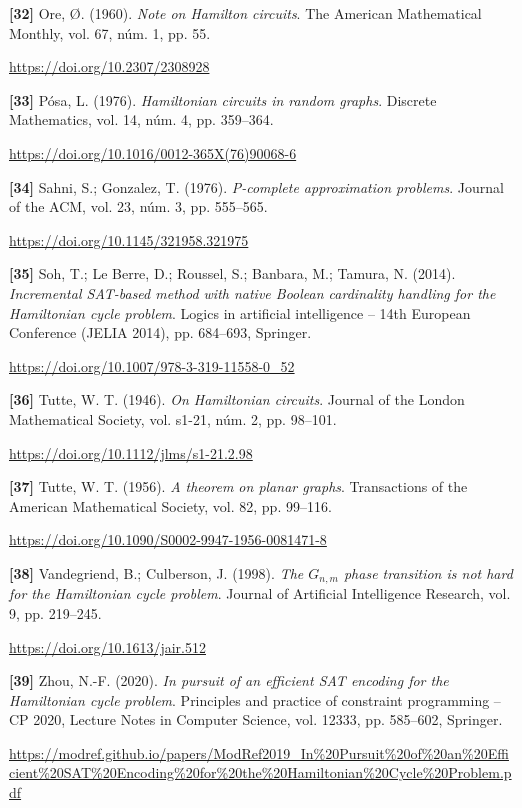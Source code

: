 \documentclass[11pt,a4paper]{article}
\newcommand{\referencia}[1]{\par\addvspace{0.8\baselineskip}\noindent\hangindent=1.1cm\hangafter=1 #1\par\nopagebreak}
\begin{document}
\begin{samepage}
\referencia{\textbf{[32]} Ore, {\O}. (1960). \textit{Note on {Hamilton} circuits}. The American Mathematical Monthly, vol. 67, núm. 1, pp. 55.}
 {\small\url{https://doi.org/10.2307/2308928}}\par
\end{samepage}
\begin{samepage}
\referencia{\textbf{[33]} P{\'o}sa, L. (1976). \textit{Hamiltonian circuits in random graphs}. Discrete Mathematics, vol. 14, núm. 4, pp. 359--364.}
 {\small\url{https://doi.org/10.1016/0012-365X(76)90068-6}}\par
\end{samepage}
\begin{samepage}
\referencia{\textbf{[34]} Sahni, S.; Gonzalez, T. (1976). \textit{P-complete approximation problems}. Journal of the ACM, vol. 23, núm. 3, pp. 555--565.}
 {\small\url{https://doi.org/10.1145/321958.321975}}\par
\end{samepage}
\begin{samepage}
\referencia{\textbf{[35]} Soh, T.; {Le Berre}, D.; Roussel, S.; Banbara, M.; Tamura, N. (2014). \textit{Incremental {SAT}-based method with native {Boolean} cardinality handling for the {Hamiltonian} cycle problem}. Logics in artificial intelligence -- 14th European Conference ({JELIA} 2014), pp. 684--693, Springer.}
 {\small\url{https://doi.org/10.1007/978-3-319-11558-0_52}}\par
\end{samepage}
\begin{samepage}
\referencia{\textbf{[36]} Tutte, W. T. (1946). \textit{On {Hamiltonian} circuits}. Journal of the London Mathematical Society, vol. s1-21, núm. 2, pp. 98--101.}
 {\small\url{https://doi.org/10.1112/jlms/s1-21.2.98}}\par
\end{samepage}
\begin{samepage}
\referencia{\textbf{[37]} Tutte, W. T. (1956). \textit{A theorem on planar graphs}. Transactions of the American Mathematical Society, vol. 82, pp. 99--116.}
 {\small\url{https://doi.org/10.1090/S0002-9947-1956-0081471-8}}\par
\end{samepage}
\begin{samepage}
\referencia{\textbf{[38]} Vandegriend, B.; Culberson, J. (1998). \textit{The $G_{n,m}$ phase transition is not hard for the {Hamiltonian} cycle problem}. Journal of Artificial Intelligence Research, vol. 9, pp. 219--245.}
 {\small\url{https://doi.org/10.1613/jair.512}}\par
\end{samepage}
\begin{samepage}
\referencia{\textbf{[39]} Zhou, N.-F. (2020). \textit{In pursuit of an efficient {SAT} encoding for the {Hamiltonian} cycle problem}. Principles and practice of constraint programming -- {CP} 2020, Lecture Notes in Computer Science, vol. 12333, pp. 585--602, Springer.}
 {\small\url{https://modref.github.io/papers/ModRef2019_In%20Pursuit%20of%20an%20Efficient%20SAT%20Encoding%20for%20the%20Hamiltonian%20Cycle%20Problem.pdf}}\par
\end{samepage}
\end{document}

